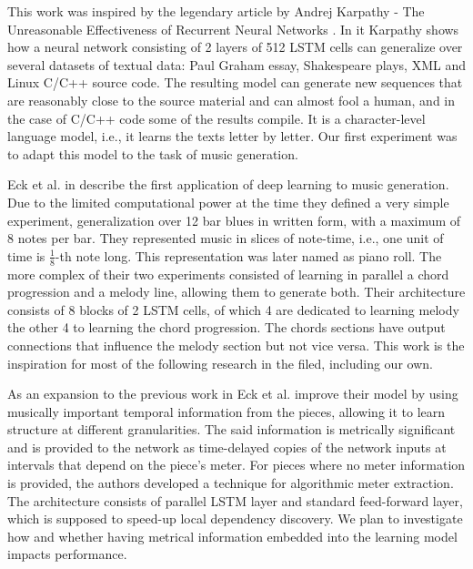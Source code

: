This work was inspired by the legendary article by Andrej Karpathy - The Unreasonable Effectiveness of Recurrent Neural Networks \cite{AndrejKarpathy2015}. In it Karpathy shows how a neural network consisting of 2 layers of 512 LSTM cells can generalize over several datasets of textual data: Paul Graham essay, Shakespeare plays, XML and Linux C/C++ source code. The resulting model can generate new sequences that are reasonably close to the source material and can almost fool a human, and in the case of C/C++ code some of the results compile. It is a character-level language model, i.e., it learns the texts letter by letter. Our first experiment was to adapt this model to the task of music generation.

Eck et al. in \cite{Eck2002} describe the first application of deep learning to music generation. Due to the limited computational power at the time they defined a very simple experiment, generalization over 12 bar blues in written form, with a maximum of 8 notes per bar. They represented music in slices of note-time, i.e., one unit of time is \(\frac{1}{8}\)-th note long. This representation was later named as piano roll. The more complex of their two experiments consisted of learning in parallel a chord progression and a melody line, allowing them to generate both. Their architecture consists of 8 blocks of 2 LSTM cells, of which 4 are dedicated to learning melody the other 4 to learning the chord progression. The chords sections have output connections that influence the melody section but not vice versa. This work is the inspiration for most of the following research in the filed, including our own.

As an expansion to the previous work in \cite{Eck2008} Eck et al. improve their model by using musically important temporal information from the pieces, allowing it to learn structure at different granularities. The said information is metrically significant and is provided to the network as time-delayed copies of the network inputs at intervals that depend on the piece's meter. For pieces where no meter information is provided, the authors developed a technique for algorithmic meter extraction. The architecture consists of parallel LSTM layer and standard feed-forward layer, which is supposed to speed-up local dependency discovery. We plan to investigate how and whether having metrical information embedded into the learning model impacts performance.

